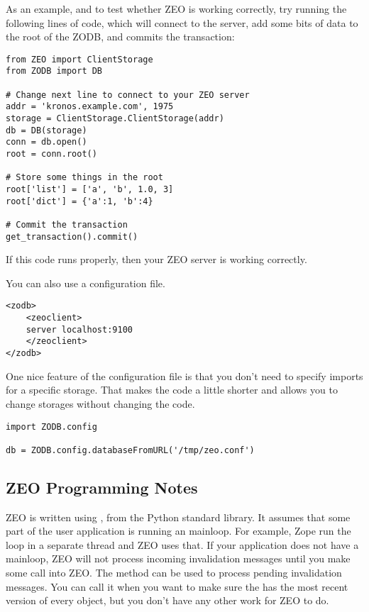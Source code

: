 As an example, and to test whether ZEO is working correctly, try
running the following lines of code, which will connect to the server,
add some bits of data to the root of the ZODB, and commits the
transaction:

\begin{verbatim}
from ZEO import ClientStorage
from ZODB import DB

# Change next line to connect to your ZEO server
addr = 'kronos.example.com', 1975
storage = ClientStorage.ClientStorage(addr)
db = DB(storage)
conn = db.open()
root = conn.root()

# Store some things in the root
root['list'] = ['a', 'b', 1.0, 3]
root['dict'] = {'a':1, 'b':4}

# Commit the transaction
get_transaction().commit()
\end{verbatim}

If this code runs properly, then your ZEO server is working correctly.

You can also use a configuration file.

\begin{verbatim}
<zodb>
    <zeoclient>
    server localhost:9100
    </zeoclient>
</zodb>
\end{verbatim}

One nice feature of the configuration file is that you don't need to
specify imports for a specific storage.  That makes the code a little
shorter and allows you to change storages without changing the code.

\begin{verbatim}
import ZODB.config

db = ZODB.config.databaseFromURL('/tmp/zeo.conf')
\end{verbatim}

\subsection{ZEO Programming Notes}

ZEO is written using , from the Python standard
library.  It assumes that some part of the user application is running
an  mainloop.  For example, Zope run the loop in a
separate thread and ZEO uses that.  If your application does not have
a mainloop, ZEO will not process incoming invalidation messages until
you make some call into ZEO.  The  method can
be used to process pending invalidation messages.  You can call it
when you want to make sure the  has the most recent
version of every object, but you don't have any other work for ZEO to do.

